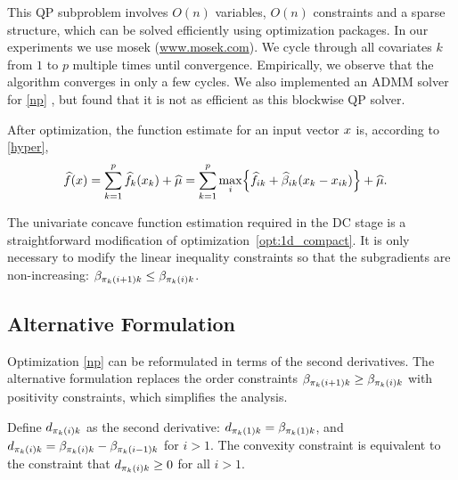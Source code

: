 This QP
subproblem involves $O(n)$ variables, $O(n)$ constraints and a sparse
structure, which can be solved efficiently using optimization
packages. In our experiments we use {\sc mosek} (\href{http://www.mosek.com/}{www.mosek.com}).  We cycle through
all covariates $k$ from $1$ to $p$ multiple times until convergence.
Empirically, we observe that the algorithm converges in only a few
cycles. We also implemented an ADMM solver for \eqref{np}
\citep{Boyd:admm}, but found
that it is not as efficient as this blockwise QP solver.

After optimization, the function estimate for an input vector $x$ is, according to \eqref{hyper},
\begin{equation}
\begin{split}
      \widehat f(x) & = \sum_{k=1}^{p} \widehat f_k(x_{k})+ \widehat \mu 
= \sum_{k=1}^{p}\max_{i} \Bigl\{\widehat f_{ik}+ \widehat \beta_{ik}(x_{k}-x_{ik})\Bigr\} +
      \widehat \mu.
\end{split}
\end{equation} 

The univariate concave function estimation required in the DC stage is a straightforward
modification of optimization~\eqref{opt:1d_compact}. It is only
necessary to modify the linear inequality constraints so that the subgradients are
non-increasing: $\beta_{\pi_k(i+1)k} \leq \beta_{\pi_k(i)k}$.


\subsection{Alternative Formulation}
Optimization \eqref{np} can be reformulated in terms of the second
derivatives. The alternative formulation replaces the order constraints
$\beta_{\pi_k(i+1)k} \geq \beta_{\pi_k(i)k}$ with positivity constraints, which
simplifies the analysis.  





Define $d_{\pi_k(i)k}$ as the second
derivative: $d_{\pi_k(1)k} = \beta_{\pi_k(1)k}$, and $d_{\pi_k(i)k} = \beta_{\pi_k(i)k} -
\beta_{\pi_k(i-1)k}$ for $i > 1$. The convexity constraint is equivalent to the
constraint that $d_{\pi_k(i)k} \geq 0$ for all $i > 1$.




